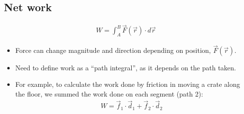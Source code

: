 \documentclass[aspectratio=169,
hyperref={colorlinks,urlcolor=blue}
]{beamer}
\begin{document}
\subsection{Net work}
\label{subsec:network}
{
\begin{align*}
W=\int_A^B \vec F(\vec r)\cdot d\vec r
\end{align*}
\begin{itemize}
\item Force can change magnitude and direction depending on position, $\vec F(\vec r)$.
\item Need to define work as a ``path integral'', as it depends on the path taken.
\item For example, to calculate the work done by friction in moving a crate along the floor, we summed the work done on each segment (path 2):
\begin{align*}
W=\vec f_1\cdot \vec d_1+\vec f_2 \cdot \vec d_2
\end{align*}
\end{itemize}
}
\end{document}
